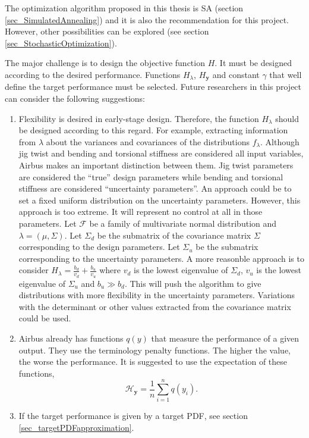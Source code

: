 The optimization algorithm proposed in this thesis is SA (section \ref{sec_SimulatedAnnealing}) and it is also the recommendation for this project. 
However, other possibilities can be explored (see section \ref{sec_StochasticOptimization}).

The major challenge is to design the objective function $H$.
It must be designed according to the desired performance.
Functions $H_{\lambda}$, $H_{\pmb{y}}$ and constant $\gamma$ that well define the target performance must be selected.
Future researchers in this project can consider the following suggestions:
\begin{enumerate}
  \item Flexibility is desired in early-stage design. 
Therefore, the function $H_{\lambda}$ should be designed according to this regard.
For example, extracting information from $\lambda$ about the variances and covariances of the distributions $f_{\lambda}$.
Although jig twist and bending and torsional stiffness are considered all input variables, Airbus makes an important distinction between them. Jig twist parameters are considered the ``true'' design parameters while bending and torsional stiffness are considered ``uncertainty parameters''.
An approach could be to set a fixed uniform distribution on the uncertainty parameters.
However, this approach is too extreme. 
It will represent no control at all in those parameters.
Let $\mathcal{F}$ be a family of multivariate normal distribution and $\lambda = (\mu, \Sigma)$.
Let $\Sigma_d$ be the submatrix of the covariance matrix $\Sigma$ corresponding to the design parameters.
Let $\Sigma_u$ be the submatrix corresponding to the uncertainty parameters.
A more reasonble approach is to consider $H_{\lambda} = \frac{b_d}{v_d} + \frac{b_u}{v_u}$ where $v_d$ is the lowest eigenvalue of $\Sigma_d$, $v_u$ is the lowest eigenvalue of $\Sigma_u$ and $b_u \gg b_d$.
This will push the algorithm to give distributions with more flexibility in the uncertainty parameters.
Variations with the determinant or other values extracted from the covariance matrix could be used.
  \item Airbus already has functions $q(y)$ that measure the performance of a given output. 
They use the terminology penalty functions.
The higher the value, the worse the performance.
It is suggested to use the expectation of these functions,
$$\mathcal{H}_{\pmb{y}} = \frac{1}{n} \sum_{i=1}^n q(y_i).$$
  \item If the target performance is given by a target PDF, see section \ref{sec_targetPDFapproximation}.

\end{enumerate}
